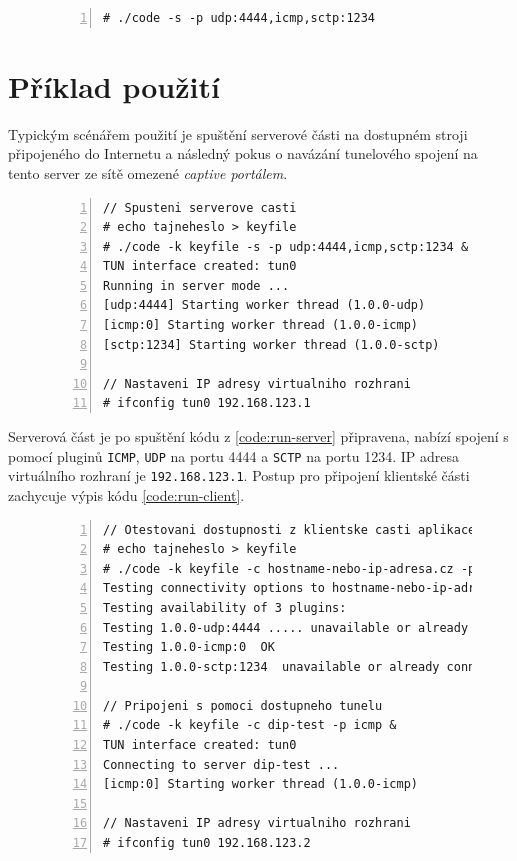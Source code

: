 \documentclass[thesis=M,czech]{FITthesis}[2012/10/20]
\begin{document}
        \begin{figure}[h]
	\begin{lstlisting}[label=code:plugin-spec-example,caption=Ukázka spuštění serverové části s více pluginy a jejich parametry,frame=single,numbers=left]
# ./code -s -p udp:4444,icmp,sctp:1234
      \end{lstlisting}
    \end{figure}
    
    \section{Příklad použití}
    
    Typickým scénářem použití je spuštění serverové části na dostupném stroji připojeného do Internetu a následný pokus o navázání tunelového spojení na tento server ze sítě omezené \textit{captive portálem}.
    
            \begin{figure}[h]
	\begin{lstlisting}[label=code:run-server,caption=Ukázka spuštění serverové části s více pluginy a jejich parametry,frame=single,numbers=left]
// Spusteni serverove casti
# echo tajneheslo > keyfile
# ./code -k keyfile -s -p udp:4444,icmp,sctp:1234 &
TUN interface created: tun0
Running in server mode ...
[udp:4444] Starting worker thread (1.0.0-udp)
[icmp:0] Starting worker thread (1.0.0-icmp)
[sctp:1234] Starting worker thread (1.0.0-sctp)

// Nastaveni IP adresy virtualniho rozhrani
# ifconfig tun0 192.168.123.1
      \end{lstlisting}
    \end{figure}
    
    Serverová část je po spuštění kódu z \ref{code:run-server} připravena, nabízí spojení s pomocí pluginů \texttt{ICMP}, \texttt{UDP} na portu 4444 a \texttt{SCTP} na portu 1234. IP adresa virtuálního rozhraní je \texttt{192.168.123.1}. Postup pro připojení klientské části zachycuje výpis kódu \ref{code:run-client}.
    
            \begin{figure}[h]
	\begin{lstlisting}[label=code:run-client,caption=Ukázka spuštění klientské části s otestováním pluginů a následném připojení s pomocí jednoho z nich,frame=single,numbers=left]
// Otestovani dostupnosti z klientske casti aplikace
# echo tajneheslo > keyfile
# ./code -k keyfile -c hostname-nebo-ip-adresa.cz -p udp:4444,icmp,sctp:1234 -t
Testing connectivity options to hostname-nebo-ip-adresa.cz ...
Testing availability of 3 plugins:
Testing 1.0.0-udp:4444 ..... unavailable or already connected
Testing 1.0.0-icmp:0  OK
Testing 1.0.0-sctp:1234  unavailable or already connected

// Pripojeni s pomoci dostupneho tunelu
# ./code -k keyfile -c dip-test -p icmp &
TUN interface created: tun0
Connecting to server dip-test ...
[icmp:0] Starting worker thread (1.0.0-icmp)

// Nastaveni IP adresy virtualniho rozhrani
# ifconfig tun0 192.168.123.2
      \end{lstlisting}
    \end{figure}
    
\end{document}
